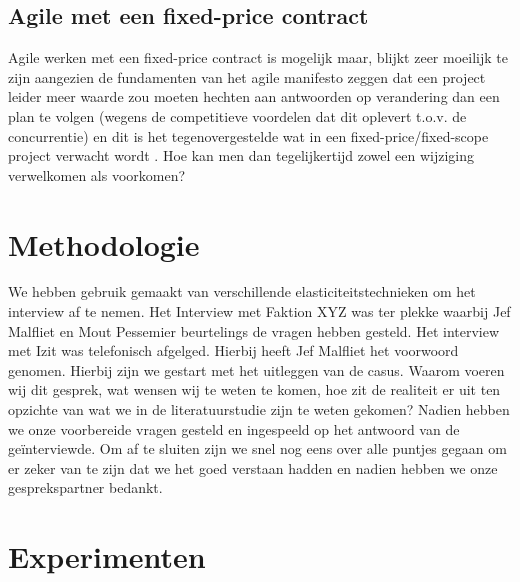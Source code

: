 \documentclass{hogent-article}
\begin{document}
    \subsection{Agile met een fixed-price contract}
    Agile werken met een fixed-price contract is mogelijk maar, blijkt zeer moeilijk te zijn aangezien de fundamenten van het agile manifesto zeggen dat een project leider meer waarde zou moeten hechten aan antwoorden op verandering dan een plan te volgen (wegens de competitieve voordelen dat dit oplevert t.o.v. de concurrentie) en dit is het tegenovergestelde wat in een fixed-price/fixed-scope project verwacht wordt \autocite{PMI2011}. Hoe kan men dan tegelijkertijd zowel een wijziging verwelkomen als voorkomen?
	
	\section{Methodologie}
	We hebben gebruik gemaakt van verschillende elasticiteitstechnieken om het interview af te nemen. Het Interview met Faktion XYZ was ter plekke waarbij Jef Malfliet en Mout Pessemier beurtelings de vragen hebben gesteld. Het interview met Izit was telefonisch afgelged. Hierbij heeft Jef Malfliet het voorwoord genomen.
	\linebreak
	Hierbij zijn we gestart met het uitleggen van de casus. Waarom voeren wij dit gesprek, wat wensen wij te weten te komen, hoe zit de realiteit er uit ten opzichte van wat we in de literatuurstudie zijn te weten gekomen? Nadien hebben we onze voorbereide vragen gesteld en ingespeeld op het antwoord van de geïnterviewde. Om af te sluiten zijn we snel nog eens over alle puntjes gegaan om er zeker van te zijn dat we het goed verstaan hadden en nadien hebben we onze gesprekspartner bedankt.
	
	\section{Experimenten}
\end{document}
